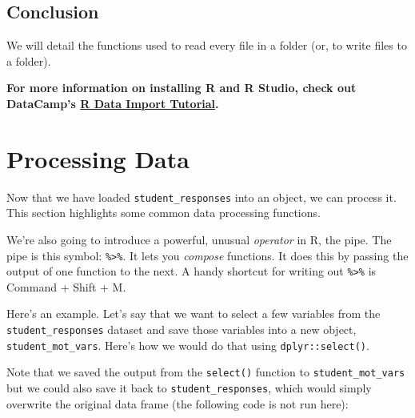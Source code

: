 \documentclass[]{book}
\newenvironment{Shaded}{\begin{snugshade}}{\end{snugshade}}
\newcommand{\KeywordTok}[1]{\textcolor[rgb]{0.13,0.29,0.53}{\textbf{#1}}}
\newcommand{\StringTok}[1]{\textcolor[rgb]{0.31,0.60,0.02}{#1}}
\newcommand{\CommentTok}[1]{\textcolor[rgb]{0.56,0.35,0.01}{\textit{#1}}}
\newcommand{\OperatorTok}[1]{\textcolor[rgb]{0.81,0.36,0.00}{\textbf{#1}}}
\newcommand{\NormalTok}[1]{#1}
\begin{document}
\subsection{Conclusion}\label{conclusion}

We will detail the functions used to read every file in a folder (or, to
write files to a folder).

\textbf{For more information on installing R and R Studio, check out
DataCamp's
\href{https://www.datacamp.com/community/tutorials/installing-R-windows-mac-ubuntu}{R
Data Import Tutorial}.}

\section{Processing Data}\label{processing-data}

Now that we have loaded \texttt{student\_responses} into an object, we
can process it. This section highlights some common data processing
functions.

We're also going to introduce a powerful, unusual \emph{operator} in R,
the pipe. The pipe is this symbol: \texttt{\%\textgreater{}\%}. It lets
you \emph{compose} functions. It does this by passing the output of one
function to the next. A handy shortcut for writing out
\texttt{\%\textgreater{}\%} is Command + Shift + M.

Here's an example. Let's say that we want to select a few variables from
the \texttt{student\_responses} dataset and save those variables into a
new object, \texttt{student\_mot\_vars}. Here's how we would do that
using \texttt{dplyr::select()}.

\begin{Shaded}
\end{Shaded}

Note that we saved the output from the \texttt{select()} function to
\texttt{student\_mot\_vars} but we could also save it back to
\texttt{student\_responses}, which would simply overwrite the original
data frame (the following code is not run here):
\end{document}
